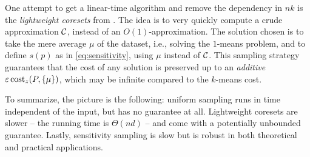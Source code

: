 %

One attempt to get a linear-time algorithm and remove the dependency in $nk$ is the \emph{lightweight coresets} from \cite{bachem2018scalable}. The idea is to
very quickly compute a crude approximation $\mathcal C$, instead of an $O(1)$-approximation. 
The solution chosen is to take the mere average $\mu$ of the dataset, i.e., solving the $1$-means problem, and to define $s(p)$ as in \cref{eq:sensitivity}, using $\mu$ instead of $\mathcal C$.
This sampling strategy guarantees that the cost of any solution is preserved up to an \textit{additive} $\varepsilon
\operatorname{cost}_z(P, \{\mu\})$, which may be infinite compared to the $k$-means cost.


To summarize, the picture is the following: uniform sampling runs in time independent of the input, but has no guarantee at all. Lightweight coresets are slower
-- the running time is $\Theta(nd)$ -- and come with a potentially unbounded guarantee. 
Lastly, sensitivity sampling is slow but is robust in both
theoretical and practical applications.
 
